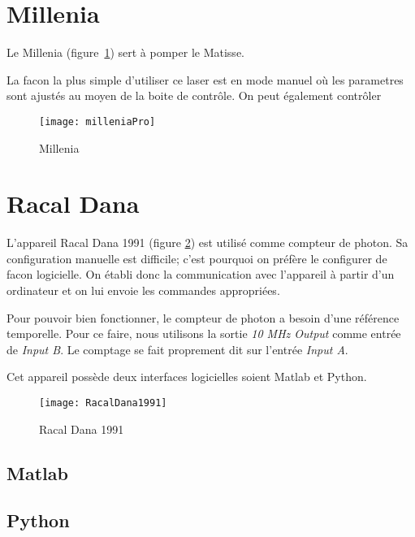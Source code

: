 \documentclass[11pt,francais]{book} %
\begin{document}

\section{Millenia}

Le Millenia (figure~\ref{fig:millenia}) sert à pomper le Matisse.

La facon la plus simple d'utiliser ce laser est en mode manuel où les parametres sont ajustés au moyen de la boite de contrôle.
On peut également contrôler 

\begin{figure}[h]
\centering\texttt{[image: milleniaPro]}
\caption{Millenia}
\label{fig:millenia}
\end{figure}


\section{Racal Dana}

L'appareil Racal Dana 1991 (figure \ref{fig:racaldana}) est utilisé comme compteur de photon.
Sa configuration manuelle est difficile; c'est pourquoi on préfère le configurer de facon logicielle.
On établi donc la communication avec l'appareil à partir d'un ordinateur et on lui envoie les commandes appropriées.

Pour pouvoir bien fonctionner, le compteur de photon a besoin d'une référence temporelle.
Pour ce faire, nous utilisons la sortie {\it 10 MHz Output} comme entrée de {\it Input B}.
Le comptage se fait proprement dit sur l'entrée {\it Input A}.

Cet appareil possède deux interfaces logicielles soient Matlab et Python.

\begin{figure}[h]
\centering\texttt{[image: RacalDana1991]}
\caption{Racal Dana 1991}
\label{fig:racaldana}
\end{figure}

\subsection{Matlab}

\subsection{Python}
\end{document}
